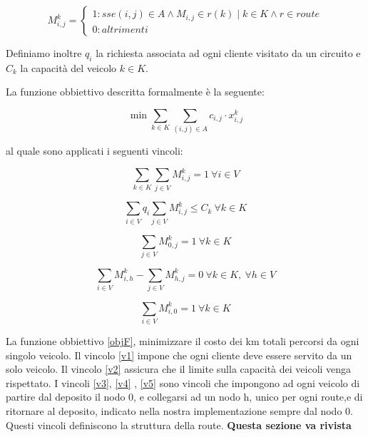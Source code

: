 \documentclass[]{article}
\begin{document}
\[M_{i,j}^k = \left\{
\begin{array}{lr}
1 :sse (i,j) \in A \wedge M_{i,j} \in  r(k) \mid k \in K \wedge r \in route\\
0 :altrimenti
\end{array}
\right.
\]

Definiamo inoltre \emph{$q_{i}$} la richiesta associata ad ogni cliente visitato da un circuito e \emph{$C_{k}$} la capacità del veicolo \emph{$k \in K$}.

La funzione obbiettivo descritta formalmente è la seguente:

\begin{equation} \label{objF}
\min \sum_{k \in K} \sum_{(i,j) \in A} c_{i,j} \cdot x_{i,j}^k 
\end{equation}



al quale sono applicati i seguenti vincoli:

\begin{equation} \label{v1}
 \sum_{k \in K} \sum_{j \in V} M_{i,j}^k = 1 \ \forall i \in V
\end{equation}

\begin{equation} \label{v2}
\sum_{i \in V} q_{i} \sum_{j \in V} M_{i,j}^k \leq C_{k} \ \forall k \in K
\end{equation}

\begin{equation} \label{v3}
\sum_{j \in V} M_{0,j}^k = 1 \ \forall k \in K
\end{equation}

\begin{equation} \label{v4}
\sum_{i \in V} M_{i,h}^k - \sum_{j \in V} M_{h,j}^k = 0 \ \forall k \in K ,\  \forall h \in V
\end{equation}

\begin{equation} \label{v5}
\sum_{i \in V} M_{i,0}^k = 1 \ \forall k \in K
\end{equation}



La funzione obbiettivo \ref{objF}, minimizzare il costo dei km totali percorsi da ogni singolo veicolo.
Il vincolo \ref{v1} impone che ogni cliente deve essere servito da un solo veicolo.
Il vincolo \ref{v2} assicura che il limite sulla capacità dei veicoli venga rispettato.
I vincoli \ref{v3}, \ref{v4} , \ref{v5} sono vincoli che impongono ad ogni veicolo di partire dal deposito il nodo 0, e collegarsi ad un nodo h, unico per ogni route,e di ritornare al deposito, indicato nella nostra implementazione sempre dal nodo 0. Questi vincoli definiscono la struttura della route.
\textbf{Questa sezione va rivista }
\end{document}
